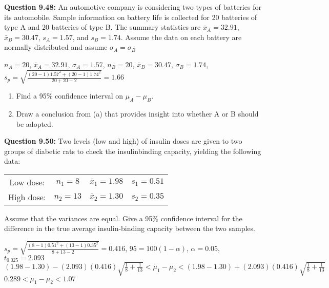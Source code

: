 \documentclass{article}
\begin{document}
\textbf{Question 9.48:}
An automotive company is considering two
types of batteries for its automobile. Sample information 
on battery life is collected for 20 batteries of
type A and 20 batteries of type B. The summary
statistics are $\bar{x}_A = 32.91$, $\bar{x}_B = 30.47$, $s_A = 1.57$,
and $s_B = 1.74$. Assume the data on each battery are
normally distributed and assume $\sigma_A = \sigma_B$
\begin{description}
    \item $n_A=20$, $\bar{x}_A=32.91$, $\sigma_A=1.57$, $n_B=20$, $\bar{x}_B=30.47$, 
    $\sigma_B=1.74$, $s_p=\sqrt{\frac{(20-1)1.57^2+(20-1)1.74^2}{20+20-2}}=1.66$
\end{description}
\begin{enumerate}[label = (\alph*) ]
    \item Find a 95\% confidence interval on $\mu_A-\mu_B$.
    \item Draw a conclusion from (a) that provides insight
    into whether A or B should be adopted.
\end{enumerate}
\textbf{Question 9.50:}
Two levels (low and high) of insulin doses are
given to two groups of diabetic rats to check the 
insulinbinding capacity, yielding the following data:
\begin{center}
\begin{tabular}{c c c c}
    Low dose: & $n_1 = 8$ & $\bar{x}_1 = 1.98$ & $s_1 = 0.51$ \\
    High dose: & $n_2 = 13$ & $\bar{x}_2 = 1.30$ & $s_2 = 0.35$
\end{tabular}
\end{center}
Assume that the variances are equal. Give a 95\% 
confidence interval for the difference in the true average
insulin-binding capacity between the two samples.
\begin{description}
    \item $s_p=\sqrt{\frac{(8-1)0.51^2+(13-1)0.35^2}{8+13-2}} = 0.416$,
    $95=100(1-\alpha)$, $\alpha=0.05$, $t_{0.025}=2.093$\\
    $(1.98-1.30)-(2.093)(0.416)\sqrt{\frac{1}{8}+\frac{1}{13}} < 
    \mu_1-\mu_2 < (1.98-1.30)+(2.093)(0.416)\sqrt{\frac{1}{8}+\frac{1}{13}}$\\
    \boldmath$0.289 < \mu_1-\mu_2 < 1.07$
\end{description}
\end{document}
